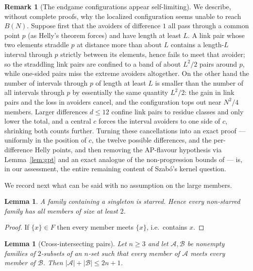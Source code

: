 \documentclass[11pt]{article}
\newtheorem{lemma}[theorem]{Lemma}
\theoremstyle{definition}
\newtheorem{remark}[theorem]{Remark}
\begin{document}
\begin{remark}[The endgame configurations appear self-limiting]\label{rem:endgame}
We describe, without complete proofs, why the localized configuration seems unable to reach $B(N)$. Suppose first that the avoiders of difference $1$ all pass through a common point $p$ (as Helly's theorem forces) and have length at least $L$. A link pair whose two elements straddle $p$ at distance more than about $L$ contains a length-$L$ interval through $p$ strictly between its elements, hence fails to meet that avoider; so the straddling link pairs are confined to a band of about $L^2/2$ pairs around $p$, while one-sided pairs miss the extreme avoiders altogether. On the other hand the number of intervals through $p$ of length at least $L$ is smaller than the number of all intervals through $p$ by essentially the same quantity $L^2/2$: the gain in link pairs and the loss in avoiders cancel, and the configuration tops out near $N^2/4$ members. Larger differences $d\le12$ confine link pairs to residue classes and only lower the total, and a central $c$ forces the interval avoiders to one side of $c$, shrinking both counts further. Turning these cancellations into an exact proof --- uniformly in the position of $c$, the twelve possible differences, and the per-difference Helly points, and then removing the AP-flavour hypothesis via Lemma~\ref{lem:gpt} and an exact analogue of the non-progression bounds of \cite{SiSo81} --- is, in our assessment, the entire remaining content of Szab\'o's kernel question.
\end{remark}

We record next what can be said with no assumption on the large members.

\begin{lemma}\label{lem:K1}
A family containing a singleton is starred. Hence every non-starred family has all members of size at least $2$.
\end{lemma}

\begin{proof}
If $\{x\}\in F$ then every member meets $\{x\}$, i.e.\ contains $x$.
\end{proof}

\begin{lemma}[Cross-intersecting pairs]\label{lem:K2}
Let $n\ge 3$ and let $\mathcal{A},\mathcal{B}$ be nonempty families of $2$-subsets of an $n$-set such that every member of $\mathcal{A}$ meets every member of $\mathcal{B}$. Then $|\mathcal{A}|+|\mathcal{B}|\le 2n+1$.
\end{lemma}
\end{document}
